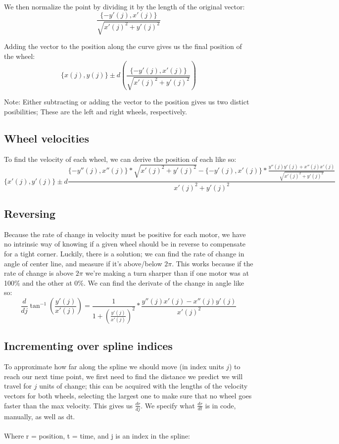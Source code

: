 \documentclass[12pt, english]{article}
\begin{document}
\noindent
We then normalize the point by dividing it by the length of the original vector: \\
\begin{equation}
	\label{deriv_speed_vec}
	\frac{\{-y'(j), x'(j)\}}{\sqrt{x'(j)^2+y'(j)^2}}
\end{equation}

\noindent
Adding the vector to the position along the curve gives us the final position of the wheel:
\begin{equation}
	\{x(j), y(j)\} \pm d \left(\frac{\{-y'(j), x'(j)\}}{\sqrt{x'(j)^2+y'(j)^2}}\right)
\end{equation}

\noindent
Note: Either subtracting or adding the vector to the position gives us two distict posibilities; These are the left and right wheels, respectively.

\subsection{Wheel velocities}
To find the velocity of each wheel, we can derive the position of each like so:
\begin{equation}
	\{x'(j), y'(j)\} \pm d\frac{\{-y''(j), x''(j)\}*\sqrt{x'(j)^2+y'(j)^2} - \{-y'(j), x'(j)\} * \frac{y''(j)y'(j) + x''(j)x'(j)}{\sqrt{x'(j)^2+y'(j)^2}}}{x'(j)^2+y'(j)^2}
\end{equation}

\subsection{Reversing}
Because the rate of change in velocity must be positive for each motor, we have no intrinsic way of knowing if a given wheel should be in reverse to compensate for a tight corner. Luckily, there is a solution; we can find the rate of change in angle of center line, and measure if it's above/below $2\pi$. This works because if the rate of change is above $2\pi$ we're making a turn sharper than if one motor was at 100\% and the other at 0\%. We can find the derivate of the change in angle like so:
\begin{equation}
	\label{change_in_angle}
	\frac{d}{dj} 
	\tan^{-1}{\left(\frac{y'(j)}{x'(j)}\right)} = 
	\frac{1}{1 + \left(\frac{y'(j)}{x'(j)}\right)^2} * \frac{y''(j)x'(j) - x''(j)y'(j)}{x'(j)^2}
\end{equation}


\subsection{Incrementing over spline indices}
To approximate how far along the spline we should move (in index units $j$) to reach our next time point, we first need to find the distance we predict we will travel for $j$ units of change; this can be acquired with the lengths of the velocity vectors for both wheels, selecting the largest one to make sure that no wheel goes faster than the max velocity. This gives us $\frac{dr}{dj}$. We specify what $\frac{dr}{dt}$ is in code, manually, as well as dt. \\
\\
\noindent
Where r = position, t = time, and j is an index in the spline:
\end{document}
